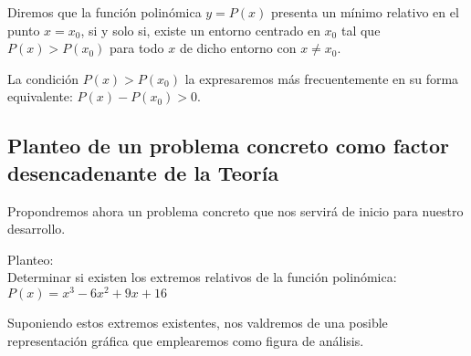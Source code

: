 \documentclass[12pt]{article}
\begin{document}
\begin{center}
\end{center}

Diremos que la función polinómica $y=P(x)$ presenta un mínimo relativo en el punto $x={x}_0$, si y solo si, existe un entorno centrado en ${x}_0$ tal que $P(x)>P({x}_0)$ para todo $x$ de dicho entorno con $x\neq{x}_0$.

La condición $P(x)>P({x}_0)$ la expresaremos más frecuentemente en su forma equiva\-lente: $P(x)-P({x}_0)>0$.

\subsection{
  Planteo de un problema concreto como factor desencadenante de la Teoría
}

Propondremos ahora un problema concreto que nos servirá de inicio para nuestro desarrollo.

Planteo:\\
Determinar si existen los extremos relativos de la función polinómica: \\
$P(x) = x^3-6x^2+9x+16$

Suponiendo estos extremos existentes, nos valdremos de una posible representación gráfica que emplearemos como figura de análisis.
\end{document}
